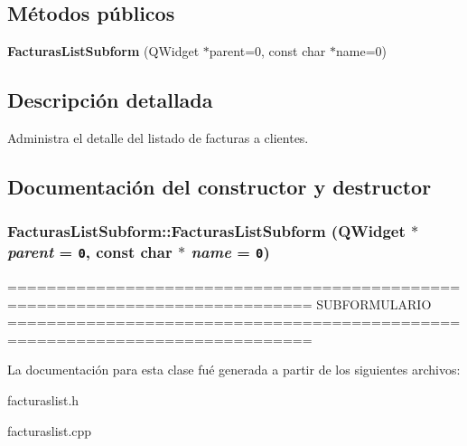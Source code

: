 \subsection*{M\'{e}todos p\'{u}blicos}
\begin{CompactItemize}
\item 
{\bf Facturas\-List\-Subform} (QWidget $\ast$parent=0, const char $\ast$name=0)
\end{CompactItemize}


\subsection{Descripci\'{o}n detallada}
Administra el detalle del listado de facturas a clientes. 



\subsection{Documentaci\'{o}n del constructor y destructor}
\subsubsection{\setlength{\rightskip}{0pt plus 5cm}Facturas\-List\-Subform::Facturas\-List\-Subform (QWidget $\ast$ {\em parent} = {\tt 0}, const char $\ast$ {\em name} = {\tt 0})}\label{classFacturasListSubform_a0}


============================================================================= SUBFORMULARIO ============================================================================= 

La documentaci\'{o}n para esta clase fu\'{e} generada a partir de los siguientes archivos:\begin{CompactItemize}
\item 
facturaslist.h\item 
facturaslist.cpp\end{CompactItemize}
